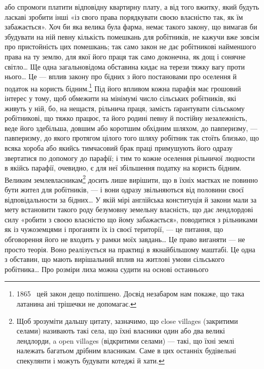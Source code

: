 \parcont{}  %
або спромоги платити відповідну квартирну плату, а від того
вжитку, який будуть ласкаві зробити інші «із свого права порядкувати
своєю власністю так, як їм забажається». Хоч би яка
велика була фарма, немає такого закону, що вимагав би збудувати
на ній певну кількість помешкань для робітників, не кажучи
вже зовсім про пристойність цих помешкань; так само
закон не дає робітникові найменшого права на ту землю, для якої
його праця так само доконечна, як дощ і сонячне світло\dots{} Ще
одна загальновідома обставина кидає на терези тяжку вагу проти
нього\dots{} Це — вплив закону про бідних з його постановами про
оселення й податок на користь бідним.\footnote{
1865~ цей закон дещо поліпшено. Досвід незабаром нам покаже,
що така латанина ані трішечки не допомагає.
} Під його впливом кожна
парафія має грошовий інтерес у тому, щоб обмежити на мінімумі
число сільських робітників, які живуть у ній, бо, на нещастя,
рільнича праця, замість ґарантувати сільському робітникові,
що тяжко працює, та його родині певну й постійну незалежність,
веде його здебільша, довшим або коротшим обхідним
шляхом, до павперизму, — павперизму, до якого протягом цілого
того шляху робітник так стоїть близько, що всяка хороба
або якийсь тимчасовий брак праці примушують його одразу звертатися
по допомогу до парафії; і тим то кожне оселення рільничої
людности в якійсь парафії, очевидно, є для неї збільшення
податку на користь бідним. Великим землевласникам\footnote{
Щоб зрозуміти дальшу цитату, зазначимо, що close villages (закритими
селами) називають такі села, що їхні власники один
або два великі лендлорди, a open villages (відкритими селами) — такі,
що їхні землі належать багатьом дрібним власникам. Саме в цих останніх
будівельні спекулянти і можуть будувати котеджі й хати.
} досить
лише вирішити, що в їхніх маєтках не повинно бути жител для
робітників, — і вони одразу звільняються від половини своєї
відповідальности за бідних\dots{} У якій мірі англійська конституція
й закони мали за мету встановити такого роду безумовну
земельну власність, що дає лендлордові силу «робити з своєю
власністю що йому забажається», поводитися з рільниками
як із чужоземцями і проганяти їх із своєї території, — це питання,
що обговорення його не входить у рамки моїх завдань\dots{}
Це право виганяти — не просто теорія. Воно реалізується
на практиці в якнайбільшому маштабі. Це одна з обставин, що
мають вирішальний вплив на житлові умови сільського робітника\dots{}
Про розміри лиха можна судити на основі останнього
